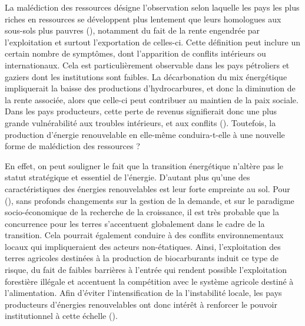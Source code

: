 La malédiction des ressources désigne l'observation selon laquelle les pays les plus riches en ressources se développent plus lentement que leurs homologues aux sous-sols plus pauvres (\cite{sachs_natural_1996}), notamment du fait de la rente engendrée par l'exploitation et surtout l'exportation de celles-ci. Cette définition peut inclure un certain nombre de symptômes, dont l'apparition de conflits intérieurs ou internationaux. Cela est particulièrement observable dans les pays pétroliers et gaziers dont les institutions sont faibles. La décarbonation du mix énergétique impliquerait la baisse des productions d'hydrocarbures, et donc la diminution de la rente associée, alors que celle-ci peut contribuer au maintien de la paix sociale. Dans les pays producteurs, cette perte de revenus signifierait donc une plus grande vulnérabilité aux troubles intérieurs, et aux conflits (\cite{osullivan_geopolitics_2017}). Toutefois, la production d'énergie renouvelable en elle-même conduira-t-elle à une nouvelle forme de malédiction des ressources ?
\smallbreak

En effet, on peut souligner le fait que la transition énergétique n'altère pas le statut stratégique et essentiel de l'énergie. D'autant plus qu'une des caractéristiques des énergies renouvelables est leur forte empreinte au sol. 
Pour (\cite{capellan-perez_assessing_2017}), sans profonds changements sur la gestion de la demande, et sur le paradigme socio-économique de la recherche de la croissance, il est très probable que la concurrence pour les terres s'accentuent globalement dans le cadre de la transition. Cela pourrait également conduire à des conflits environnementaux locaux qui impliqueraient des acteurs non-étatiques. Ainsi, l'exploitation des terres agricoles destinées à la production de biocarburants induit ce type de risque, du fait de faibles barrières à l'entrée qui rendent possible l'exploitation forestière illégale et accentuent la compétition avec le système agricole destiné à l'alimentation. Afin d'éviter l'intensification de la l'instabilité locale, les pays producteurs d'énergies renouvelables ont donc intérêt à renforcer le pouvoir institutionnel à cette échelle (\cite{mansson_resource_2015}). 
\smallbreak

